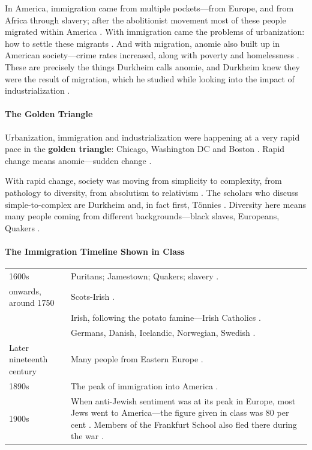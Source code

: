 In America, immigration came from multiple pockets---from Europe, and from Africa through slavery; after the abolitionist movement most of these people migrated within America .
With immigration came the problems of urbanization: how to settle these migrants . And with migration, anomie also built up in American society---crime rates increased, along with poverty and homelessness . These are precisely the things Durkheim calls anomie, and Durkheim knew they were the result of migration, which he studied while looking into the impact of industrialization .

\paragraph{The Golden Triangle}
\begin{DataFact}
Urbanization, immigration and industrialization were happening at a very rapid pace in the \textbf{golden triangle}: Chicago, Washington DC and Boston .
Rapid change means anomie---sudden change .
\end{DataFact}

With rapid change, society was moving from simplicity to complexity, from pathology to diversity, from absolutism to relativism . The scholars who discuss simple-to-complex are Durkheim and, in fact first, T{\"o}nnies .
Diversity here means many people coming from different backgrounds---black slaves, Europeans, Quakers .

\paragraph{The Immigration Timeline Shown in Class}
\vspace{6pt}
\noindent
\begin{tabularx}{\textwidth}{>{\hsize}Y >{\hsize}Y}
\toprule
{}
 &  \\
\midrule
1600s & Puritans; Jamestown; Quakers; slavery . \\
 onwards, around 1750 & Scots-Irish . \\
 & Irish, following the potato famine---Irish Catholics . \\
 & Germans, Danish, Icelandic, Norwegian, Swedish . \\
\midrule
Later nineteenth century & Many people from Eastern Europe . \\
\midrule
1890s & The peak of immigration into America . \\
\midrule
1900s & When anti-Jewish sentiment was at its peak in Europe, most Jews went to America---the figure given in class was 80 per cent . Members of the Frankfurt School also fled there during the war . \\
\bottomrule
\end{tabularx}
\vspace{6pt}


